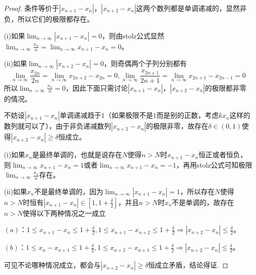 \documentclass[../../main.tex]{subfiles}%
\begin{document}
\begin{proof}

条件等价于\(|x_{n + 1}-x_n|\)，\(|x_{n + 2}-x_n|\)这两个数列都是单调递减的，显然非负，所以它们的极限都存在。

(i)如果\(\lim_{n\rightarrow\infty}|x_{n + 1}-x_n| = 0\)，则由stolz公式显然\(\lim_{n\rightarrow\infty}\frac{x_n}{n}=\lim_{n\rightarrow\infty}x_{n + 1}-x_n = 0\)。

(ii)如果\(\lim_{n\rightarrow\infty}|x_{n + 2}-x_n| = 0\)，则奇偶两个子列分别都有
\[
\lim_{n\rightarrow\infty}\frac{x_{2n}}{2n}=\lim_{n\rightarrow\infty}x_{2n + 2}-x_{2n}=0, 
\lim_{n\rightarrow\infty}\frac{x_{2n + 1}}{2n + 1}=\lim_{n\rightarrow\infty}x_{2n + 1}-x_{2n - 1}=0
\]
所以\(\lim_{n\rightarrow\infty}\frac{x_n}{n}=0\)，因此下面只需讨论\(|x_{n + 1}-x_n|\)，\(|x_{n + 2}-x_n|\)的极限都非零的情况。

不妨设\(|x_{n + 1}-x_n|\)单调递减趋于\(1\)（如果极限不是\(1\)而是别的正数，考虑\(kx_n\)这样的数列就可以了），由于非负递减数列\(|x_{n + 2}-x_n|\)的极限非零，故存在\(\delta\in(0,1)\)使得\(|x_{n + 2}-x_n|\geqslant \delta\)恒成立。

(i)如果\(x_n\)是最终单调的，也就是说存在\(N\)使得\(n > N\)时\(x_{n + 1}-x_n\)恒正或者恒负，则\(\lim_{n\rightarrow\infty}x_{n + 1}-x_n = 1\)或者\(\lim_{n\rightarrow\infty}x_{n + 1}-x_n=-1\)，再用stolz公式可知极限\(\lim_{n\rightarrow\infty}\frac{x_n}{n}\)存在。

(ii)如果\(x_n\)不是最终单调的，因为\(\lim_{n\rightarrow\infty}|x_{n + 1}-x_n| = 1\)，所以存在\(N\)使得\(n > N\)时恒有\(|x_{n + 1}-x_n|\in\left[1,1+\frac{\delta}{2}\right]\)，并且\(n > N\)时\(x_n\)不是单调的，故存在\(n > N\)使得以下两种情况之一成立

\((a)\)：\(1\leqslant  x_{n + 1}-x_n\leqslant 1+\frac{\delta}{2},1\leqslant  x_{n + 1}-x_{n + 2}\leqslant 1+\frac{\delta}{2}\Rightarrow|x_{n + 2}-x_n|\leqslant \frac{\delta}{2}\)。

\((b)\)：\(1\leqslant  x_n - x_{n + 1}\leqslant 1+\frac{\delta}{2},1\leqslant  x_{n + 2}-x_{n + 1}\leqslant 1+\frac{\delta}{2}\Rightarrow|x_{n + 2}-x_n|\leqslant \frac{\delta}{2}\)。

可见不论哪种情况成立，都会与\(|x_{n + 2}-x_n|\geqslant \delta\)恒成立矛盾，结论得证.

\end{proof}
\end{document}

